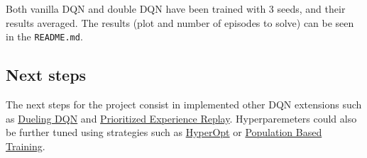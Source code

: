\documentclass{article}
\begin{document}
    Both vanilla DQN and double DQN have been trained with 3 seeds, and their results averaged.
    The results (plot and number of episodes to solve) can be seen in the \texttt{README.md}.

    \subsection{Next steps}

    The next steps for the project consist in implemented other DQN extensions such as
    \href{https://arxiv.org/abs/1511.06581}{Dueling DQN} and
    \href{https://arxiv.org/abs/1511.05952}{Prioritized Experience Replay}.
    Hyperparemeters could also be further tuned using strategies such as
    \href{https://github.com/hyperopt/hyperopt}{HyperOpt} or
    \href{https://deepmind.com/blog/article/population-based-training-neural-networks}{Population Based Training}.
\end{document}
